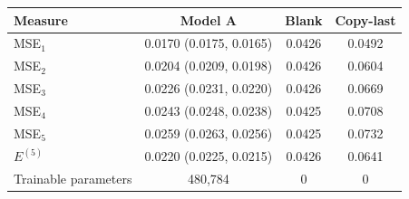 \begin{tabular}{lccc}
\toprule
Measure & Model A & Blank & Copy-last \\
\midrule
MSE$_1$ & 0.0170 (0.0175, 0.0165) & 0.0426 & 0.0492 \\
MSE$_2$ & 0.0204 (0.0209, 0.0198) & 0.0426 & 0.0604 \\
MSE$_3$ & 0.0226 (0.0231, 0.0220) & 0.0426 & 0.0669 \\
MSE$_4$ & 0.0243 (0.0248, 0.0238) & 0.0425 & 0.0708 \\
MSE$_5$ & 0.0259 (0.0263, 0.0256) & 0.0425 & 0.0732 \\
$E^{(5)}$ & 0.0220 (0.0225, 0.0215) & 0.0426 & 0.0641 \\
Trainable parameters & 480,784 & 0 & 0 \\
\bottomrule
\end{tabular}
